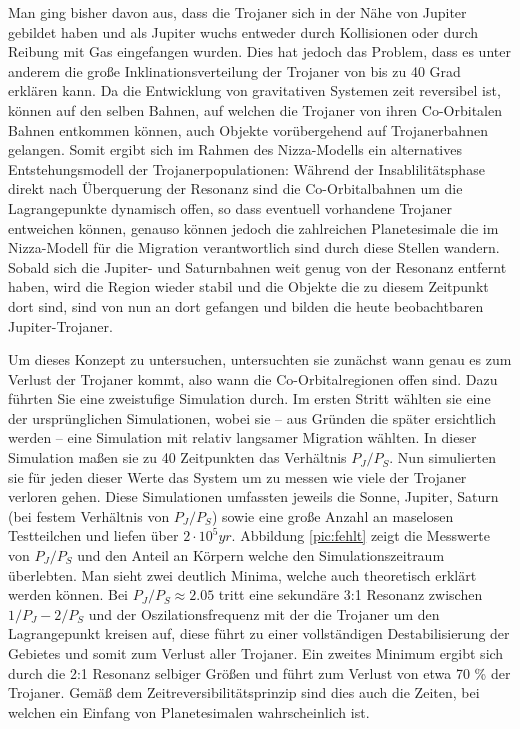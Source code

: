 \documentclass[10pt,a4paper,twoside]{article}
\begin{document}
Man ging bisher davon aus, dass die Trojaner sich in der Nähe von Jupiter gebildet haben und als Jupiter wuchs entweder durch Kollisionen oder durch Reibung mit Gas %
eingefangen wurden.
Dies hat jedoch das Problem, dass es unter anderem die große Inklinationsverteilung der Trojaner von bis zu 40 Grad erklären kann\cite{Morbidelli2005}. %
Da die Entwicklung von gravitativen Systemen zeit reversibel ist, %
können auf den selben Bahnen, auf welchen die Trojaner von ihren Co-Orbitalen Bahnen entkommen können, auch Objekte vorübergehend auf Trojanerbahnen gelangen.
Somit ergibt sich im Rahmen des Nizza-Modells ein alternatives Entstehungsmodell der Trojanerpopulationen: Während der Insablilitätsphase direkt nach Überquerung der Resonanz sind die Co-Orbitalbahnen um die Lagrangepunkte dynamisch offen, so dass eventuell vorhandene Trojaner entweichen können, genauso können jedoch die zahlreichen Planetesimale die im Nizza-Modell für die Migration verantwortlich sind durch diese Stellen wandern. %
Sobald sich die Jupiter- und Saturnbahnen weit genug von der Resonanz entfernt haben, wird die Region wieder stabil und die Objekte die zu diesem Zeitpunkt dort sind, sind von nun an dort gefangen und bilden die heute beobachtbaren Jupiter-Trojaner.

\newcommand{\PJS}{P_J/P_S}
Um dieses Konzept zu untersuchen, untersuchten sie zunächst wann genau es zum Verlust der Trojaner kommt, also wann die Co-Orbitalregionen offen sind. %
Dazu führten Sie eine zweistufige Simulation durch. Im ersten Stritt wählten sie eine der ursprünglichen Simulationen, wobei sie – aus Gründen die später ersichtlich werden – eine Simulation mit relativ langsamer Migration wählten. %
In dieser Simulation maßen sie zu 40 Zeitpunkten das Verhältnis $\PJS$.
Nun simulierten sie für jeden dieser Werte das System um zu messen wie viele der Trojaner verloren gehen. Diese Simulationen umfassten jeweils die Sonne, Jupiter, Saturn (bei festem Verhältnis von $P_J/P_S$) sowie eine große Anzahl an maselosen Testteilchen und liefen über $2 \cdot 10^5 yr$.
Abbildung \ref{pic:fehlt} zeigt die Messwerte von $\PJS$ und den Anteil an Körpern welche den Simulationszeitraum überlebten. Man sieht zwei deutlich Minima, welche auch theoretisch erklärt werden können.
Bei $\PJS \approx 2.05$ tritt eine sekundäre 3:1 Resonanz zwischen $1/P_J-2/P_S$ und der Oszilationsfrequenz mit der die Trojaner um den Lagrangepunkt kreisen auf, diese führt zu einer vollständigen Destabilisierung der Gebietes und somit zum Verlust aller Trojaner.
Ein zweites Minimum ergibt sich durch die 2:1 Resonanz selbiger Größen und führt zum Verlust von etwa 70 \% der Trojaner.
Gemäß dem Zeitreversibilitätsprinzip sind dies auch die Zeiten, bei welchen ein Einfang von Planetesimalen wahrscheinlich ist.
\end{document}
